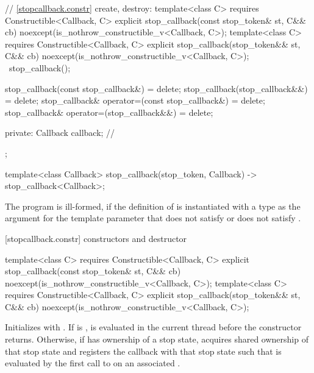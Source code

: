 {\begin{codeblock}
{{    // \ref{stopcallback.constr} create, destroy:
    template<class C>
        requires Constructible<Callback, C>
    explicit stop_callback(const stop_token& st, C&& cb)
        noexcept(is_nothrow_constructible_v<Callback, C>);
    template<class C>
        requires Constructible<Callback, C>
    explicit stop_callback(stop_token&& st, C&& cb)
        noexcept(is_nothrow_constructible_v<Callback, C>);
    ~stop_callback();

    stop_callback(const stop_callback&) = delete;
    stop_callback(stop_callback&&) = delete;
    stop_callback& operator=(const stop_callback&) = delete;
    stop_callback& operator=(stop_callback&&) = delete;

  private:
    Callback callback;      // \expos
  };

  template<class Callback>
  stop_callback(stop_token, Callback) -> stop_callback<Callback>;
}
\end{codeblock}

The program is ill-formed, if the definition of  is
instantiated with a type as the argument for the template parameter
 that does not satisfy  or does not satisfy
.

[stopcallback.constr]{ constructors and destructor}

%
\begin{itemdecl}
template<class C>
  requires Constructible<Callback, C>
explicit stop_callback(const stop_token& st, C&& cb)
  noexcept(is_nothrow_constructible_v<Callback, C>);
template<class C>
  requires Constructible<Callback, C>
explicit stop_callback(stop_token&& st, C&& cb)
  noexcept(is_nothrow_constructible_v<Callback, C>);
\end{itemdecl}
\begin{itemdescr}
  \pnum\effects Initializes  with .
                If  is ,
                is evaluated
                in the current thread before the constructor returns.
                Otherwise, if  has ownership of a stop state,
                acquires shared ownership of that stop state and registers
                the callback with that stop state such that 
                is evaluated by the first call to  on an associated
                .


\end{itemdescr}}
